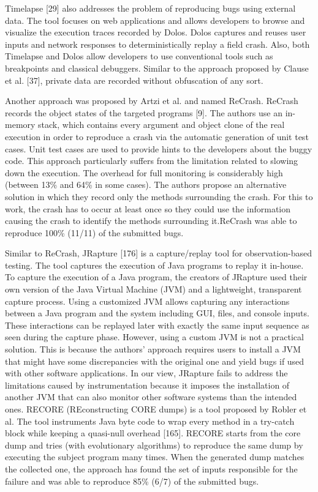 \documentclass[12pt]{report}
\begin{document}
Timelapse {[}29{]} also addresses the problem of reproducing bugs using
external data. The tool focuses on web applications and allows
developers to browse and visualize the execution traces recorded by
Dolos. Dolos captures and reuses user inputs and network responses to
deterministically replay a field crash. Also, both Timelapse and Dolos
allow developers to use conventional tools such as breakpoints and
classical debuggers. Similar to the approach proposed by Clause et al.
{[}37{]}, private data are recorded without obfuscation of any sort.

Another approach was proposed by Artzi et al. and named ReCrash. ReCrash
records the object states of the targeted programs {[}9{]}. The authors
use an in-memory stack, which contains every argument and object clone
of the real execution in order to reproduce a crash via the automatic
generation of unit test cases. Unit test cases are used to provide hints
to the developers about the buggy code. This approach particularly
suffers from the limitation related to slowing down the execution. The
overhead for full monitoring is considerably high (between 13\% and 64\%
in some cases). The authors propose an alternative solution in which
they record only the methods surrounding the crash. For this to work,
the crash has to occur at least once so they could use the information
causing the crash to identify the methods surrounding it.ReCrash was
able to reproduce 100\% (11/11) of the submitted bugs.

Similar to ReCrash, JRapture {[}176{]} is a capture/replay tool for
observation-based testing. The tool captures the execution of Java
programs to replay it in-house. To capture the execution of a Java
program, the creators of JRapture used their own version of the Java
Virtual Machine (JVM) and a lightweight, transparent capture process.
Using a customized JVM allows capturing any interactions between a Java
program and the system including GUI, files, and console inputs. These
interactions can be replayed later with exactly the same input sequence
as seen during the capture phase. However, using a custom JVM is not a
practical solution. This is because the authors' approach requires users
to install a JVM that might have some discrepancies with the original
one and yield bugs if used with other software applications. In our
view, JRapture fails to address the limitations caused by
instrumentation because it imposes the installation of another JVM that
can also monitor other software systems than the intended ones. RECORE
(REconstructing CORE dumps) is a tool proposed by Robler et al. The tool
instruments Java byte code to wrap every method in a try-catch block
while keeping a quasi-null overhead {[}165{]}. RECORE starts from the
core dump and tries (with evolutionary algorithms) to reproduce the same
dump by executing the subject program many times. When the generated
dump matches the collected one, the approach has found the set of inputs
responsible for the failure and was able to reproduce 85\% (6/7) of the
submitted bugs.
\end{document}
